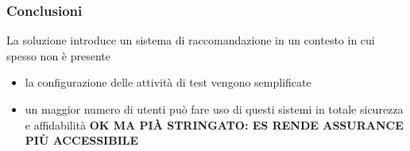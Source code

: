 \begin{frame}
    \frametitle{Conclusioni}
    La soluzione introduce un sistema di raccomandazione in un contesto in cui spesso non è presente %
    \begin{itemize}
        \item la configurazione delle \alert{attività di test} vengono \alert{semplificate} 
        \item un maggior numero di utenti può fare uso di questi sistemi in totale sicurezza e affidabilità \textbf{OK MA PIÀ STRINGATO: ES RENDE ASSURANCE PIÙ ACCESSIBILE}
    \end{itemize}
\end{frame}

